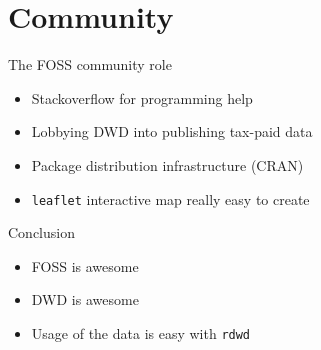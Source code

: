 \documentclass[compress, xcolor=dvipsnames]{beamer}\usepackage[]{graphicx}\usepackage[]{color}
\begin{document}

\section{Community}


\begin{frame}{The FOSS community role}
\pause
\begin{itemize}[<+->]
\item Stackoverflow for programming help
\item Lobbying DWD into publishing tax-paid data
\item Package distribution infrastructure (CRAN)
\item \texttt{leaflet} interactive map really easy to create
\end{itemize}
\end{frame}


\begin{frame}{Conclusion}
\pause
\begin{itemize}[<+->]
\item FOSS is awesome
\item DWD is awesome
\item Usage of the data is easy with \texttt{rdwd}
\end{itemize}
\end{frame}

\end{document}
